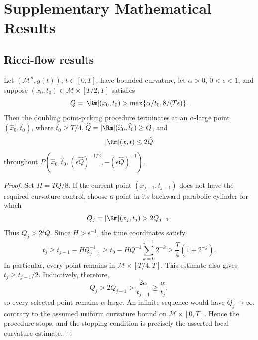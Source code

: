 \chapter{Supplementary Mathematical Results}
\label{app:chow-iii-selected-exercise-solutions}

\section{Ricci-flow results}

\begin{proposition}
\label{prop:chow-iii-appj-solution-22-2}
Let \((\mathcal M^n,g(t))\), \(t\in[0,T]\), have bounded curvature, let
\(\alpha>0\), \(0<\epsilon<1\), and suppose
\((x_0,t_0)\in\mathcal M\times[T/2,T]\) satisfies
\[
 Q=|\Rm|(x_0,t_0)>\max\{\alpha/t_0,8/(T\epsilon)\}.
\]
Then the doubling point-picking procedure terminates at an
\(\alpha\)-large point \((\widehat x_0,\widehat t_0)\), where
\(\widehat t_0\geq T/4\), \(\widehat Q=|\Rm|(\widehat x_0,\widehat t_0)\geq Q\),
and
\[
 |\Rm|(x,t)\leq2\widehat Q
\]
throughout
\(P(\widehat x_0,\widehat t_0,
(\epsilon\widehat Q)^{-1/2},-(\epsilon\widehat Q)^{-1})\).
\end{proposition}
\begin{proof}
\sketch
Set \(H=TQ/8\).  If the current point \((x_{j-1},t_{j-1})\) does not
have the required curvature control, choose a point in its backward
parabolic cylinder for which
\[
 Q_j=|\Rm|(x_j,t_j)>2Q_{j-1}.
\]
Thus \(Q_j>2^jQ\).  Since \(H>\epsilon^{-1}\), the time coordinates satisfy
\[
 t_j\geq t_{j-1}-HQ_{j-1}^{-1}
 \geq t_0-HQ^{-1}\sum_{k=0}^{j-1}2^{-k}
 \geq \frac T4(1+2^{-j}).
\]
In particular, every point remains in \(\mathcal M\times[T/4,T]\).  This
estimate also gives \(t_j\geq t_{j-1}/2\).  Inductively, therefore,
\[
 Q_j>2Q_{j-1}>\frac{2\alpha}{t_{j-1}}
 \geq\frac{\alpha}{t_j},
\]
so every selected point remains \(\alpha\)-large.  An infinite sequence would
have \(Q_j\to\infty\), contrary to the assumed uniform curvature bound on
\(\mathcal M\times[0,T]\).  Hence the procedure stops, and the stopping
condition is precisely the asserted local curvature estimate.
\end{proof}

